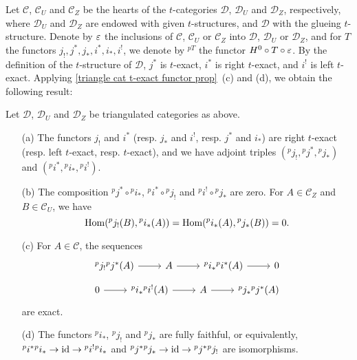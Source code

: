 Let $\mathcal{C}$, $\mathcal{C}_U$ and $\mathcal{C}_Z$ be the hearts of the $t$-categories $\mathcal{D}$, $\mathcal{D}_U$ and $\mathcal{D}_Z$, respectively, where $\mathcal{D}_U$ and $\mathcal{D}_Z$ are endowed with given $t$-structures, and $\mathcal{D}$ with the glueing $t$-structure. Denote by $\varepsilon$ the inclusions of $\mathcal{C}$, $\mathcal{C}_U$ or $\mathcal{C}_Z$ into $\mathcal{D}$, $\mathcal{D}_U$ or $\mathcal{D}_Z$, and for $T$ the functors $j_!,j^*,j_*,i^*,i_*,i^!$, we denote by $^{pT}$ the functor $H^0\circ T\circ\varepsilon$. By the definition of the $t$-structure of $\mathcal{D}$, $j^*$ is $t$-exact, $i^*$ is right $t$-exact, and $i^!$ is left $t$-exact. Applying \cref{triangle cat t-exact functor prop}~(c) and (d), we obtain the following result:
\begin{proposition}\label{triangle car recollement functors composition and exact sequence}
Let $\mathcal{D}$, $\mathcal{D}_U$ and $\mathcal{D}_Z$ be triangulated categories as above.
\begin{enumerate}
    \item[(a)] The functors $j_!$ and $i^*$ (resp. $j_*$ and $i^!$, resp. $j^*$ and $i_*$) are right $t$-exact (resp. left $t$-exact, resp. $t$-exact), and we have adjoint triples $({^pj_!},{^pj^*},{^pj_*})$ and $({^pi^*},{^pi_*},{^pi^!})$.
    \item[(b)] The composition ${^pj^*}\circ{^pi_*}$, ${^pi^*}\circ{^pj_!}$ and ${^pi^!}\circ{^pj_*}$ are zero. For $A\in\mathcal{C}_Z$ and $B\in\mathcal{C}_U$, we have
\[\mathrm{Hom}({^pj_!}(B),{^pi_*}(A))=\mathrm{Hom}({^pi_*}(A),{^pj_*}(B))=0.\]
    \item[(c)] For $A\in\mathcal{C}$, the sequences
    \[\begin{tikzcd}
        {^pj_!}{^pj^*}(A)\ar[r]&A\ar[r]&{^pi_*}{^pi^*}(A)\ar[r]&0
    \end{tikzcd}\]
    \vspace*{-4mm}
    \[\begin{tikzcd}
        0\ar[r]&{^pi_*}{^pi^!}(A)\ar[r]&A\ar[r]&{^pj_*}{^pj^*}(A)
    \end{tikzcd}\]
    are exact.
    \item[(d)] The functors ${^pi_*}$, ${^pj_!}$ and ${^pj_*}$ are fully faithful, or equivalently, ${^pi^*}{^pi_*}\to\operatorname{id}\to{^pi^!}{^pi_*}$ and ${^pj^*}{^pj_*}\to\operatorname{id}\to{^pj^*}{^pj_!}$ are isomorphisms. 
\end{enumerate}
\end{proposition}
